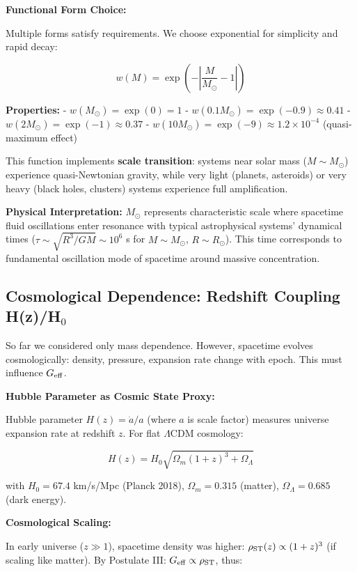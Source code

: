 \documentclass[11pt,a4paper]{article}
\begin{document}
\textbf{Functional Form Choice:}

Multiple forms satisfy requirements. We choose exponential for
simplicity and rapid decay:

\[w(M) = \exp\left(-\left|\frac{M}{M_\odot} - 1\right|\right)\]

\textbf{Properties:} - \(w(M_\odot) = \exp(0) = 1\) \checkmark{} -
\(w(0.1 M_\odot) = \exp(-0.9) \approx 0.41\) -
\(w(2 M_\odot) = \exp(-1) \approx 0.37\) -
\(w(10 M_\odot) = \exp(-9) \approx 1.2 \times 10^{-4}\) (quasi-maximum
effect)

This function implements \textbf{scale transition}: systems near solar
mass (\(M \sim M_\odot\)) experience quasi-Newtonian gravity, while very
light (planets, asteroids) or very heavy (black holes, clusters) systems
experience full amplification.

\textbf{Physical Interpretation:} \(M_\odot\) represents characteristic
scale where spacetime fluid oscillations enter resonance with typical
astrophysical systems' dynamical times
(\(\tau \sim \sqrt{R^3/GM} \sim 10^6\) s for \(M \sim M_\odot\),
\(R \sim R_\odot\)). This time corresponds to fundamental oscillation
mode of spacetime around massive concentration.

\hypertarget{cosmological-dependence-redshift-coupling-hzhux2080}{%
\subsection{Cosmological Dependence: Redshift Coupling H(z)/H$_{0}$}\label{cosmological-dependence-redshift-coupling-hzhux2080}}

So far we considered only mass dependence. However, spacetime evolves
cosmologically: density, pressure, expansion rate change with epoch.
This must influence \(G_{\rm eff}\).

\textbf{Hubble Parameter as Cosmic State Proxy:}

Hubble parameter \(H(z) = \dot{a}/a\) (where \(a\) is scale factor)
measures universe expansion rate at redshift \(z\). For flat
\(\Lambda\)CDM cosmology:

\[H(z) = H_0 \sqrt{\Omega_m (1+z)^3 + \Omega_\Lambda}\]

with \(H_0 = 67.4\) km/s/Mpc (Planck 2018), \(\Omega_m = 0.315\)
(matter), \(\Omega_\Lambda = 0.685\) (dark energy).

\textbf{Cosmological Scaling:}

In early universe (\(z \gg 1\)), spacetime density was higher:
\(\rho_{\rm ST}(z) \propto (1+z)^3\) (if scaling like matter). By
Postulate III: \(G_{\rm eff} \propto \rho_{\rm ST}\), thus:
\end{document}
